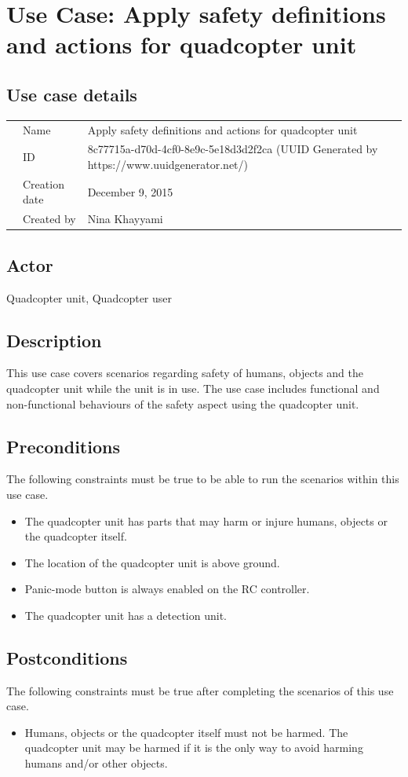 \documentclass[a4paper]{article}
\begin{document}
\section{Use Case: Apply safety definitions and actions for quadcopter unit}
\subsection{Use case details}

\begin{tabular}{lll}
	&Name  & Apply safety definitions and actions for quadcopter unit\\
	&ID  & 8c77715a-d70d-4cf0-8e9c-5e18d3d2f2ca (UUID Generated by https://www.uuidgenerator.net/)  \\
	&Creation date  & December 9, 2015\\
	&Created by  & Nina Khayyami
\end{tabular}

\subsection{Actor}
Quadcopter unit, Quadcopter user
\subsection{Description}
This use case covers scenarios regarding safety of humans, objects and the quadcopter unit while the unit is in use. The use case includes functional and non-functional behaviours of the safety aspect using the quadcopter unit. 
\subsection{Preconditions}
The following constraints must be true to be able to run the scenarios within this use case.
\begin{itemize}
\item The quadcopter unit has parts that may harm or injure humans, objects or the quadcopter itself.
\item The location of the quadcopter unit is above ground.
\item Panic-mode button is always enabled on the RC controller.
\item The quadcopter unit has a detection unit.
\end{itemize}
\subsection{Postconditions}
The following constraints must be true after completing the scenarios of this use case.
\begin{itemize}
\item Humans, objects or the quadcopter itself must not be harmed. The quadcopter unit may be harmed if it is the only way to avoid harming humans and/or other objects.
\end{itemize}
\end{document}
